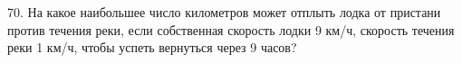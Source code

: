 70. На какое наибольшее число километров может отплыть лодка от пристани против течения реки, если собственная скорость лодки 9 км/ч, скорость течения реки 1 км/ч, чтобы успеть вернуться через 9 часов?\\
